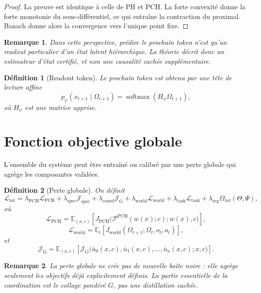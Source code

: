 \documentclass[11pt,a4paper]{article}
\newtheorem{definition}{Définition}[section]
\newtheorem{remark}{Remarque}[section]
\DeclareMathOperator{\softmax}{softmax}
\newcommand{\Pcal}{\mathcal P}
\newcommand{\1}{\mathbf 1}
\begin{document}
\begin{proof}
La preuve est identique à celle de PH et PCH.  
La forte convexité donne la forte monotonie du sous-différentiel, ce qui entraîne la contraction du proximal.  
Banach donne alors la convergence vers l'unique point fixe.
\end{proof}

\begin{remark}
Dans cette perspective, prédire le prochain token n'est qu'un readout particulier d'un état latent hiérarchique.  
La théorie décrit donc un estimateur d'état certifié, et non une causalité cachée supplémentaire.
\end{remark}

\begin{definition}[Readout token]
Le prochain token est obtenu par une tête de lecture affine
\[
p_\psi(x_{t+1}\mid \Omega_{t+1})
=
\softmax(H_\psi \Omega_{t+1}),
\]
où \(H_\psi\) est une matrice apprise.
\end{definition}

\section{Fonction objective globale}

L'ensemble du système peut être entraîné ou calibré par une perte globale qui agrège les composantes validées.

\begin{definition}[Perte globale]
On définit
\[
\mathcal L_{\mathrm{tot}}
=
\lambda_{\mathrm{PCH}}\mathcal L_{\mathrm{PCH}}
+
\lambda_{\mathrm{spec}}\mathcal J_{\mathrm{spec}}
+
\lambda_{\mathrm{coord}}\mathcal J_{\mathrm{G}}
+
\lambda_{\mathrm{world}}\mathcal L_{\mathrm{world}}
+
\lambda_{\mathrm{task}}\mathcal L_{\mathrm{task}}
+
\lambda_{\mathrm{reg}}\Omega_{\mathrm{tot}}(\Theta,\Psi),
\]
où
\[
\mathcal L_{\mathrm{PCH}}
=
\mathbb E_{(x,c)}\!\left[
J_{\mathrm{PCH}}\bigl(\Pcal^{\mathrm{PCH}}(w(x);c);w(x),c\bigr)
\right],
\]
\[
\mathcal L_{\mathrm{world}}
=
\mathbb E_{t}\!\left[
J_{\mathrm{world}}(\Omega_{t+1};\Omega_t,o_t,a_t)
\right],
\]
et
\[
\mathcal J_{\mathrm{G}}
=
\mathbb E_{(x,c)}\!\left[
\mathcal J_{\mathrm{G}}\bigl(\bar u_0(x,c),\bar u_1(x,c),\dots,\bar u_n(x,c);x,c\bigr)
\right].
\]
\end{definition}

\begin{remark}
La perte globale ne crée pas de nouvelle boîte noire : elle agrège seulement les objectifs déjà explicitement définis.  
La partie essentielle de la coordination est le collage pondéré \(G\), pas une distillation cachée.
\end{remark}
\end{document}
